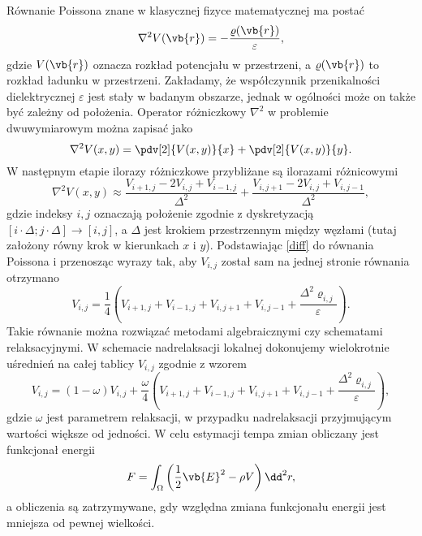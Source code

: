 \documentclass[a4paper, 12pt]{article}
\begin{document}
	Równanie Poissona znane w klasycznej fizyce matematycznej ma postać
	\begin{equation}
		\nabla^2 V(\vb{r}) = - \frac{\varrho(\vb{r})}{\varepsilon},
	\end{equation}
	gdzie $V(\vb{r})$ oznacza rozkład potencjału w przestrzeni, a $\varrho(\vb{r})$ to rozkład ładunku w przestrzeni. Zakładamy, że współczynnik przenikalności dielektrycznej $\varepsilon$ jest stały w badanym obszarze, jednak w ogólności może on także być zależny od położenia.
	Operator różniczkowy $\nabla^2$ w problemie dwuwymiarowym można zapisać jako
	\begin{equation}
		\nabla^2V(x,y) = \pdv[2]{V(x,y)}{x}+\pdv[2]{V(x,y)}{y}.
	\end{equation}
	W następnym etapie ilorazy różniczkowe przybliżane są ilorazami różnicowymi
	\begin{equation}
		\nabla^2V(x,y) \approx \frac{V_{i+1,j}  - 2V_{i,j} + V_{i-1,j}}{\Delta^2} + \frac{V_{i,j+1}  - 2V_{i,j} + V_{i,j-1}}{\Delta^2}, \label{diff}
	\end{equation}
	gdzie indeksy $i,j$ oznaczają położenie zgodnie z dyskretyzacją $[i\cdot\Delta;j\cdot\Delta] \rightarrow [i,j]$, a $\Delta$ jest krokiem przestrzennym między węzłami (tutaj założony równy krok w kierunkach $x$ i $y$). 
	Podstawiając \ref{diff} do równania Poissona i przenosząc wyrazy tak, aby $V_{i,j}$ został sam na jednej stronie równania otrzymano
	\begin{equation}
		V_{i,j} = \frac{1}{4}\left( V_{i+1,j} + V_{i-1,j} + V_{i,j+1} + V_{i,j-1} + \frac{\Delta^2\varrho_{i,j}}{\varepsilon}\right).
	\end{equation}
	Takie równanie można rozwiązać metodami algebraicznymi czy schematami relaksacyjnymi. 
	W schemacie nadrelaksacji lokalnej dokonujemy wielokrotnie uśrednień na całej tablicy $V_{i,j}$ zgodnie z wzorem
	\begin{equation}
		V_{i,j} = (1-\omega)V_{i,j} + \frac{\omega}{4} \left( V_{i+1,j} + V_{i-1,j} + V_{i,j+1} + V_{i,j-1} + \frac{\Delta^2\varrho_{i,j}}{\varepsilon}\right),
	\end{equation}
	gdzie $\omega$ jest parametrem relaksacji, w przypadku nadrelaksacji przyjmującym wartości większe od jedności.
	W celu estymacji tempa zmian obliczany jest funkcjonał energii 
	\begin{equation}
		F = \int_{\Omega} \left(\frac{1}{2} \vb{E}^2 - \rho V \right) \dd^2r,
	\end{equation}
	a obliczenia są zatrzymywane, gdy względna zmiana funkcjonału energii jest mniejsza od pewnej wielkości.
	
\end{document}
